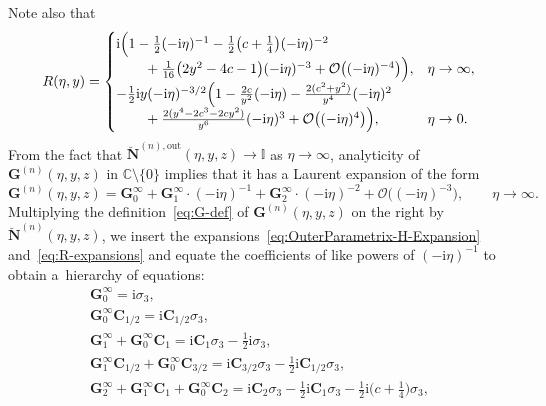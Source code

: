 \documentclass[11pt]{article}
\numberwithin{equation}{section}
\numberwithin{equation}{section}
\begin{document}
Note also that
\begin{gather}
 R(\eta,y) =\begin{cases}
\mathrm{i} \Bigl(1-\tfrac{1}{2}(-\mathrm{i}\eta)^{-1} -\tfrac{1}{2}\bigl(c+\tfrac{1}{4}\bigr)(-\mathrm{i}\eta)^{-2} &\\
\qquad{} + \tfrac{1}{16}\bigl(2y^2-4c-1\bigr)(-\mathrm{i}\eta)^{-3} + \mathcal{O}\bigl((-\mathrm{i}\eta)^{-4}\bigr)\Bigr), &
\eta\to\infty, \\
-\tfrac{1}{2}\mathrm{i} y (-\mathrm{i}\eta)^{-3/2}\Bigl(1-\frac{2c}{y^2}(-\mathrm{i}\eta) -\frac{2(c^2+y^2)}{y^4}(-\mathrm{i}\eta)^2 &\\
\qquad{} +\frac{2(y^4-2c^3-2cy^2)}{y^6}(-\mathrm{i}\eta)^3+\mathcal{O}\bigl((-\mathrm{i}\eta)^{4}\bigr)\Bigr), &
\eta\to 0.
\end{cases}
\label{eq:R-expansions}
\end{gather}
From the fact that $\breve{\mathbf{N}}^{(n),\mathrm{out}}(\eta,y,z)\to\mathbb{I}$ as $\eta\to\infty$, analyticity of $\mathbf{G}^{(n)}(\eta,y,z)$ in $\mathbb{C}\setminus\{0\}$ implies that it has a Laurent expansion of the form
\begin{equation*}
\mathbf{G}^{(n)}(\eta,y,z)= \mathbf{G}^\infty_0 + \mathbf{G}^\infty_1\cdot (-\mathrm{i}\eta)^{-1} + \mathbf{G}^\infty_2\cdot(-\mathrm{i}\eta)^{-2} + \mathcal{O}\bigl((-\mathrm{i}\eta)^{-3}\bigr),\qquad\eta\to\infty.
\end{equation*}
Multiplying the definition~\eqref{eq:G-def} of $\mathbf{G}^{(n)}(\eta,y,z)$ on the right by $\breve{\mathbf{N}}^{(n)}(\eta,y,z)$, we insert the expansions~\eqref{eq:OuterParametrix-H-Expansion} and~\eqref{eq:R-expansions} and equate the coefficients of like powers of $(-\mathrm{i}\eta)^{-1}$ to obtain a~hierarchy of equations:
\begin{gather*}
\mathbf{G}^\infty_0=\mathrm{i}\sigma_3,
\\
\mathbf{G}^\infty_0\mathbf{C}_{1/2} = \mathrm{i}\mathbf{C}_{1/2}\sigma_3,
\\
\mathbf{G}^\infty_1+\mathbf{G}^\infty_0\mathbf{C}_1 = \mathrm{i}\mathbf{C}_1\sigma_3-\tfrac{1}{2}\mathrm{i}\sigma_3,
\\
\mathbf{G}^\infty_1\mathbf{C}_{1/2} +\mathbf{G}^\infty_0\mathbf{C}_{3/2}=\mathrm{i}\mathbf{C}_{3/2}\sigma_3-\tfrac{1}{2}\mathrm{i}\mathbf{C}_{1/2}\sigma_3,
\\
\mathbf{G}^\infty_2 + \mathbf{G}^\infty_1\mathbf{C}_1 + \mathbf{G}^\infty_0\mathbf{C}_2 = \mathrm{i}\mathbf{C}_2\sigma_3 -\tfrac{1}{2}\mathrm{i}\mathbf{C}_1\sigma_3-\tfrac{1}{2}\mathrm{i} \bigl(c+\tfrac{1}{4}\bigr)\sigma_3,
\end{gather*}
\end{document}
